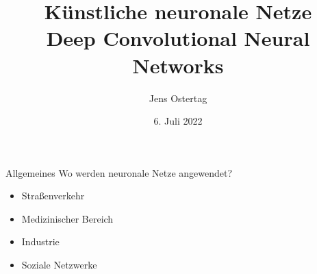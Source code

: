 \documentclass{beamer}
\title[Künstliche neuronale Netze]{\textbf{Künstliche neuronale Netze}\\[5pt]\small Deep Convolutional Neural Networks}
\author{Jens Ostertag}
\date{6. Juli 2022}
\begin{document}
\begin{frame}
\titlepage
\end{frame}

\begin{frame}[t]{Allgemeines}
Wo werden neuronale Netze angewendet?
\begin{itemize}
\item Straßenverkehr
\item Medizinischer Bereich
\item Industrie
\item Soziale Netzwerke
\end{itemize}
\end{frame}
\end{document}
